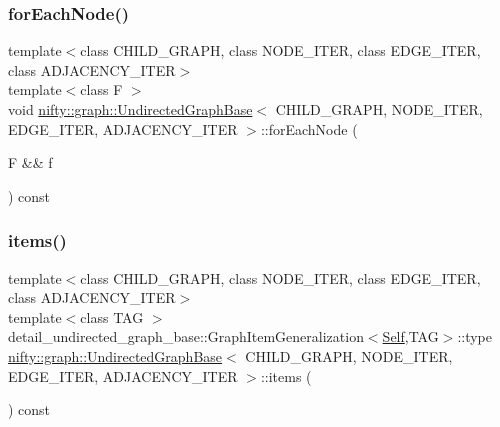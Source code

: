 \mbox{\label{classnifty_1_1graph_1_1UndirectedGraphBase_acf69fdb47f3729d55311adab5a6b97ef}} 
\subsubsection{\texorpdfstring{for\+Each\+Node()}{forEachNode()}}
{\footnotesize\ttfamily template$<$class C\+H\+I\+L\+D\+\_\+\+G\+R\+A\+PH, class N\+O\+D\+E\+\_\+\+I\+T\+ER, class E\+D\+G\+E\+\_\+\+I\+T\+ER, class A\+D\+J\+A\+C\+E\+N\+C\+Y\+\_\+\+I\+T\+ER$>$ \\
template$<$class F $>$ \\
void \hyperlink{classnifty_1_1graph_1_1UndirectedGraphBase}{nifty\+::graph\+::\+Undirected\+Graph\+Base}$<$ C\+H\+I\+L\+D\+\_\+\+G\+R\+A\+PH, N\+O\+D\+E\+\_\+\+I\+T\+ER, E\+D\+G\+E\+\_\+\+I\+T\+ER, A\+D\+J\+A\+C\+E\+N\+C\+Y\+\_\+\+I\+T\+ER $>$\+::for\+Each\+Node (\begin{DoxyParamCaption}\item[{F \&\&}]{f }\end{DoxyParamCaption}) const\hspace{0.3cm}{\ttfamily [inline]}}

\mbox{\label{classnifty_1_1graph_1_1UndirectedGraphBase_ac1e7c6a7e6e20cb8b184e331789965cd}} 
\subsubsection{\texorpdfstring{items()}{items()}}
{\footnotesize\ttfamily template$<$class C\+H\+I\+L\+D\+\_\+\+G\+R\+A\+PH, class N\+O\+D\+E\+\_\+\+I\+T\+ER, class E\+D\+G\+E\+\_\+\+I\+T\+ER, class A\+D\+J\+A\+C\+E\+N\+C\+Y\+\_\+\+I\+T\+ER$>$ \\
template$<$class T\+AG $>$ \\
detail\+\_\+undirected\+\_\+graph\+\_\+base\+::\+Graph\+Item\+Generalization$<$\hyperlink{classnifty_1_1graph_1_1UndirectedGraphBase_a3a637f240a8d05794be99e5f290a71b9}{Self},T\+AG$>$\+::type \hyperlink{classnifty_1_1graph_1_1UndirectedGraphBase}{nifty\+::graph\+::\+Undirected\+Graph\+Base}$<$ C\+H\+I\+L\+D\+\_\+\+G\+R\+A\+PH, N\+O\+D\+E\+\_\+\+I\+T\+ER, E\+D\+G\+E\+\_\+\+I\+T\+ER, A\+D\+J\+A\+C\+E\+N\+C\+Y\+\_\+\+I\+T\+ER $>$\+::items (\begin{DoxyParamCaption}{ }\end{DoxyParamCaption}) const\hspace{0.3cm}{\ttfamily [inline]}}

